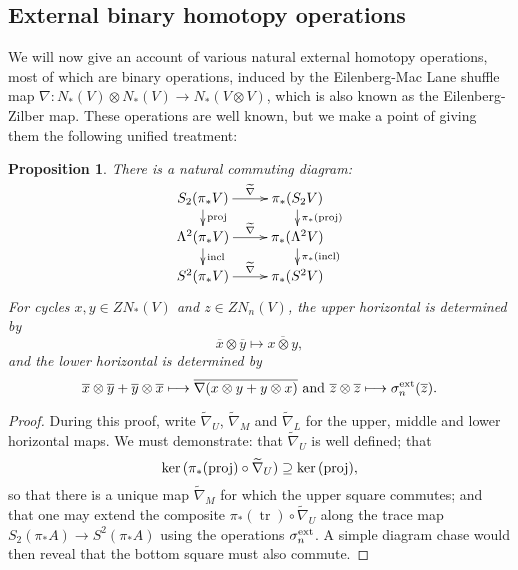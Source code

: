 \documentclass[11pt]{amsart} \renewcommand{\baselinestretch}{1.2}
\theoremstyle{plain}
\newtheorem{prop}[thm]{Proposition}
\numberwithin{equation}{section} %
\theoremstyle{plain}
\newtheorem{prop}[thm]{Proposition}
\numberwithin{equation}{chapter} %
\renewcommand{\ker}{\mathrm{ker}\,}
\DeclareMathOperator{\trace}{tr}
\renewcommand{\to}{\longrightarrow}
\newcommand{\calV}{\mathcal{V}}
\newcommand{\vect}[2]{\calV^{#1}_{#2}}
\renewcommand{\mapsto}{\longmapsto}
\newcommand{\SubsectionOrSection}[1]{\subsection{#1}}
\begin{document}
\begin{Constructing homotopy operations}
\SubsectionOrSection{External binary homotopy operations}\label{External binary homotopy operations}
We will now give an account of various natural external homotopy operations, most of which are binary operations, induced by the  Eilenberg-Mac Lane shuffle map $\nabla:N_*(V)\otimes N_*(V)\to N_*(V\otimes V)$, which is also known as the Eilenberg-Zilber map. These operations are well known, but we make a point of giving them the following unified treatment:
\begin{prop}
\label{the top external homotopy operations}
There is a natural commuting diagram:
\[\xymatrix@R=4mm{
S_2(\pi_*V)\ar[r]^-{\smash{\widetilde{\nabla}}}
\ar[d]^-{\textup{proj}}
&%
\pi_*(S_2V)\ar[d]^-{\pi_*(\textup{proj})}
\\%
\Lambda^2(\pi_*V)\ar[r]^-{\widetilde{\nabla}}
\ar[d]^-{\textup{incl}}
&%
\pi_*(\Lambda^2V)\ar[d]^-{\pi_*(\textup{incl})}
\\%
S^2(\pi_*V)\ar[r]^-{\widetilde{\nabla}}&%
\pi_*(S^2V)%
}\]
For cycles $x,y\in ZN_*(V)$ and $z\in ZN_n(V)$, the upper horizontal is determined by
\[\overline{x}\otimes\overline{y}\mapsto \overline{x\otimes y},\]
and the lower horizontal is determined by
\[\overline{x}\otimes\overline{y}+\overline{y}\otimes \overline{x}\mapsto\overline{\nabla(x\otimes y+y\otimes x)}\textup{ and }\overline{z}\otimes\overline{z}\mapsto\sigma^\textup{ext}_n(\overline{z}).\]
\end{prop}
\begin{proof}
During this proof, write $\widetilde{\nabla}_U$, $\widetilde{\nabla}_M$ and $\widetilde{\nabla}_L$ for the upper, middle and lower horizontal maps. We must demonstrate: that $\widetilde{\nabla}_U$  is well defined; that
\[\ker(\pi_*(\textup{proj})\circ\widetilde{\nabla}_U)\supseteq\ker(\textup{proj}),\]
so that there is a unique map $\widetilde{\nabla}_M$ for which the upper square commutes; and that one may extend the composite $\pi_*(\trace)\circ\widetilde{\nabla}_U$ along the trace map $S_2(\pi_*A)\to S^2(\pi_*A)$ using the operations
$\sigma_n^\textup{ext}$.
A simple diagram chase would then reveal that the bottom square must also commute.


\end{proof}
\end{Constructing homotopy operations}
\end{document}

